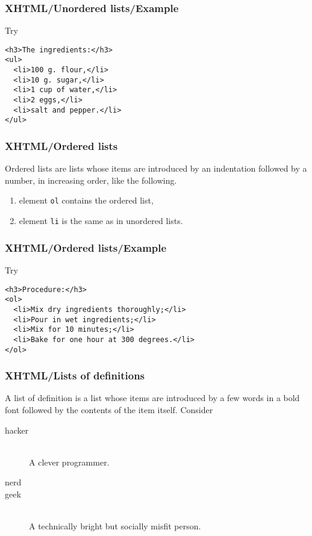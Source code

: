 %
\begin{frame}[containsverbatim]
\frametitle{XHTML/Unordered lists/Example}

Try
\begin{verbatim}
<h3>The ingredients:</h3>
<ul>
  <li>100 g. flour,</li>
  <li>10 g. sugar,</li>
  <li>1 cup of water,</li>
  <li>2 eggs,</li>
  <li>salt and pepper.</li>
</ul>
\end{verbatim}

\end{frame}

%
\begin{frame}
\frametitle{XHTML/Ordered lists}

Ordered lists are lists whose items are introduced by an indentation
followed by a number, in increasing order, like the following.
\begin{enumerate}

  \item element \texttt{ol} contains the ordered list,

  \item element \texttt{li} is the same as in unordered lists.

\end{enumerate}

\end{frame}

%
\begin{frame}[containsverbatim]
\frametitle{XHTML/Ordered lists/Example}

Try
\begin{verbatim}
<h3>Procedure:</h3>
<ol>
  <li>Mix dry ingredients thoroughly;</li>
  <li>Pour in wet ingredients;</li>
  <li>Mix for 10 minutes;</li>
  <li>Bake for one hour at 300 degrees.</li>
</ol>
\end{verbatim}

\end{frame}

%
\begin{frame}
\frametitle{XHTML/Lists of definitions}

A list of definition is a list whose items are introduced by a few
words in a bold font followed by the contents of the item
itself. Consider
\begin{description}

  \item[hacker]\ \\
    A clever programmer.

  \item[nerd]

  \item[geek]\ \\
    A technically bright but socially misfit person.

\end{description}


\end{frame}

